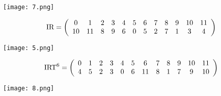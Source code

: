 	\begin{center}
		\texttt{[image: 7.png]}
	\end{center}
	\bigskip\bigskip
	\[\mbox{IR}=\left(\begin{array}{*{12}c}0&1&2&3&4&5&6&7&8&9&10&11\\10&11&8&9&6&0&5&2&7&1&3&4\\\end{array}\right)\]
	\begin{center}
		\texttt{[image: 5.png]}
	\end{center}
	\bigskip\bigskip
	\[\mbox{IRT}^6=\left(\begin{array}{*{12}c}0&1&2&3&4&5&6&7&8&9&10&11\\4&5&2&3&0&6&11&8&1&7&9&10\\\end{array}\right)\]
	\begin{center}
		\texttt{[image: 8.png]}
	\end{center}